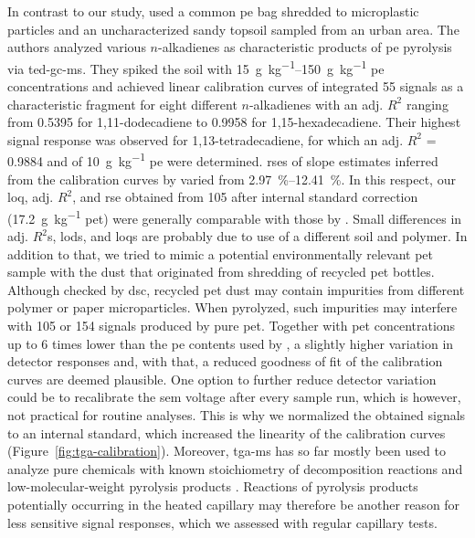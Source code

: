 In contrast to our study, \citet{DumichenFast2017} used a common \ac{pe} bag shredded to microplastic particles and an uncharacterized sandy topsoil sampled from an urban area. The authors analyzed various $n$-alkadienes as characteristic products of \ac{pe} pyrolysis via \ac{ted-gc-ms}. They spiked the soil with \SIrange[range-phrase = { to }]{15}{150}{\gram\per\kilo\gram} \ac{pe} concentrations and achieved linear calibration curves of integrated \SI{55}{\mz} signals as a characteristic fragment for eight different $n$-alkadienes with an adj. $R^2$ ranging from \num{0.5395} for 1,11-dodecadiene to \num{0.9958} for 1,15-hexadecadiene. Their highest signal response was observed for 1,13-tetradecadiene, for which an adj. $R^2$ = \num{0.9884} and  of \SI{10}{\gram\per\kilo\gram} \ac{pe} were determined.
\Acp{rse} of slope estimates inferred from the calibration curves by \citet{DumichenAnalysis2015} varied from \SIrange[range-phrase = { to }]{2.97}{12.41}{\percent}. In this respect, our \ac{loq}, adj. $R^2$, and \ac{rse} obtained from \SI{105}{\mz} after internal standard correction (\SI{17.2}{\gram\per\kilo\gram} \ac{pet}) were generally comparable with those by \citet{DumichenAnalysis2015}.
Small differences in adj. $R^2$s, \acp{lod}, and \acp{loq} are probably due to use of a different soil and polymer. In addition to that, we tried to mimic a potential environmentally relevant \ac{pet} sample with the dust that originated from shredding of recycled \ac{pet} bottles.
Although checked by \ac{dsc}, recycled \ac{pet} dust may contain impurities from different polymer or paper microparticles.
When pyrolyzed, such impurities may interfere with \num{105} or \SI{154}{\mz} signals produced by pure \ac{pet}.
Together with \ac{pet} concentrations up to \num{6} times lower than the \ac{pe} contents used by \citet{DumichenAnalysis2015}, a slightly higher variation in detector responses and, with that, a reduced goodness of fit of the calibration curves are deemed plausible. One option to further reduce detector variation could be to recalibrate the \ac{sem} voltage after every sample run, which is however, not practical for routine analyses. This is why we normalized the obtained signals to an internal standard, which increased the linearity of the calibration curves (Figure~\ref{fig:tga-calibration}).
Moreover, \ac{tga-ms} has so far mostly been used to analyze pure chemicals with known stoichiometry of decomposition reactions and low-molecular-weight pyrolysis products \citep{HotovaQuantitative2016}. Reactions of pyrolysis products potentially occurring in the heated capillary may therefore be another reason for less sensitive signal responses, which we assessed with regular capillary tests.

